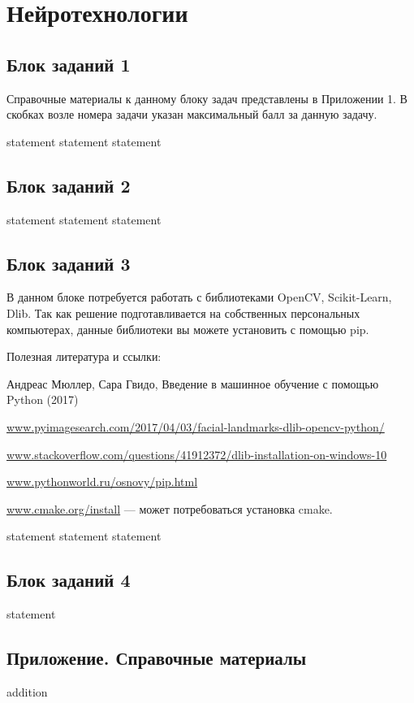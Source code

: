 \chapter{Нейротехнологии}

\section{Блок заданий 1}

Справочные материалы к данному блоку задач представлены в Приложении 1. В скобках возле номера задачи указан максимальный балл за данную задачу.

{statement}
{statement}
{statement}

\section{Блок заданий 2}

{statement}
{statement}
{statement}

\section{Блок заданий 3}

В данном блоке потребуется работать с библиотеками OpenCV, Scikit-Learn, Dlib. Так как решение подготавливается на собственных персональных компьютерах, данные библиотеки вы можете установить с помощью pip.

Полезная литература и ссылки:

Андреас Мюллер, Сара Гвидо, Введение в машинное обучение с помощью Python (2017)

\url{www.pyimagesearch.com/2017/04/03/facial-landmarks-dlib-opencv-python/}

\url{www.stackoverflow.com/questions/41912372/dlib-installation-on-windows-10}

\url{www.pythonworld.ru/osnovy/pip.html}

\url{www.cmake.org/install} — может потребоваться установка cmake.

{statement}
{statement}
{statement}

\section{Блок заданий 4}

{statement}

\section{Приложение. Справочные материалы}

{addition}